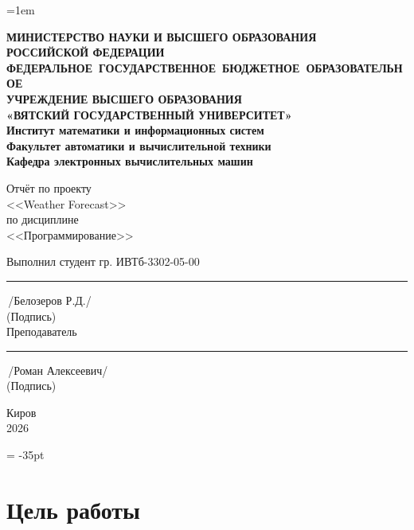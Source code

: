\documentclass[11pt,a4paper]{article}
\begin{document}
\sloppy
\emergencystretch=1em
\setlength{\footskip}{10mm}

\newpage\thispagestyle{plain}
\thispagestyle{empty}
\begin{center}
\textbf{МИНИСТЕРСТВО НАУКИ И ВЫСШЕГО ОБРАЗОВАНИЯ\\
РОССИЙСКОЙ ФЕДЕРАЦИИ\\[2ex]
\mbox{ФЕДЕРАЛЬНОЕ ГОСУДАРСТВЕННОЕ БЮДЖЕТНОЕ ОБРАЗОВАТЕЛЬНОЕ}\\
УЧРЕЖДЕНИЕ ВЫСШЕГО ОБРАЗОВАНИЯ\\
«ВЯТСКИЙ ГОСУДАРСТВЕННЫЙ УНИВЕРСИТЕТ»\\[2ex]
Институт математики и информационных систем\\[2ex]
Факультет автоматики и вычислительной техники\\[2ex]
Кафедра электронных вычислительных машин}
\end{center}
\vspace{35mm}

\begin{center}
Отчёт по проекту\\
<<Weather Forecast>>\\
по дисциплине\\
<<Программирование>>\\[1ex]
\end{center}
\vspace{45mm}
\begin{flushleft}
Выполнил студент гр. ИВТб-3302-05-00 \hspace{42mm} \rule[-0,5mm]{30mm}{0.15mm}\,/Белозеров Р.Д./\\
\mbox{\tiny\hspace{124mm}(Подпись)}\\[1ex]
Преподаватель  \hspace{78mm} \rule[-0,5mm]{30mm}{0.15mm}\,/Роман Алексеевич/\\
\mbox{\tiny\hspace{122mm}(Подпись)}
\end{flushleft}
\vfill
\begin{center}
Киров\\
2026
\end{center}

\newpage
\topmargin = -35pt

\section*{\normalsize Цель работы}
\end{document}
